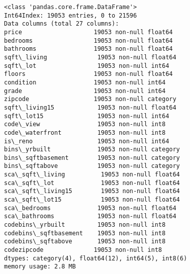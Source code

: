 \documentclass[11pt]{article}
\begin{document}
    \begin{Verbatim}[commandchars=\\\{\}]
<class 'pandas.core.frame.DataFrame'>
Int64Index: 19053 entries, 0 to 21596
Data columns (total 27 columns):
price                    19053 non-null float64
bedrooms                 19053 non-null float64
bathrooms                19053 non-null float64
sqft\_living              19053 non-null float64
sqft\_lot                 19053 non-null int64
floors                   19053 non-null float64
condition                19053 non-null int64
grade                    19053 non-null int64
zipcode                  19053 non-null category
sqft\_living15            19053 non-null float64
sqft\_lot15               19053 non-null int64
code\_view                19053 non-null int8
code\_waterfront          19053 non-null int8
is\_reno                  19053 non-null int64
bins\_yrbuilt             19053 non-null category
bins\_sqftbasement        19053 non-null category
bins\_sqftabove           19053 non-null category
sca\_sqft\_living          19053 non-null float64
sca\_sqft\_lot             19053 non-null float64
sca\_sqft\_living15        19053 non-null float64
sca\_sqft\_lot15           19053 non-null float64
sca\_bedrooms             19053 non-null float64
sca\_bathrooms            19053 non-null float64
codebins\_yrbuilt         19053 non-null int8
codebins\_sqftbasement    19053 non-null int8
codebins\_sqftabove       19053 non-null int8
codezipcode              19053 non-null int8
dtypes: category(4), float64(12), int64(5), int8(6)
memory usage: 2.8 MB

    \end{Verbatim}
\end{document}
